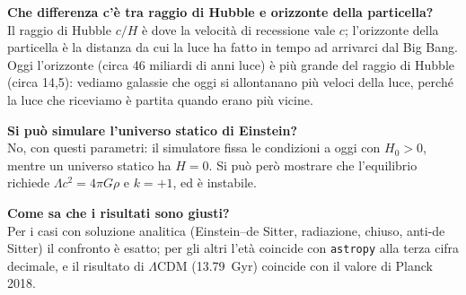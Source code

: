 \documentclass[11pt,a4paper]{article}
\begin{document}
\begin{orale}
\textbf{Che differenza c'è tra raggio di Hubble e orizzonte della particella?}\\
Il raggio di Hubble $c/H$ è dove la velocità di recessione vale $c$; l'orizzonte della particella è la distanza da cui la luce ha fatto in tempo ad arrivarci dal Big Bang. Oggi l'orizzonte (circa 46 miliardi di anni luce) è più grande del raggio di Hubble (circa 14,5): vediamo galassie che oggi si allontanano più veloci della luce, perché la luce che riceviamo è partita quando erano più vicine.
\end{orale}

\begin{orale}
\textbf{Si può simulare l'universo statico di Einstein?}\\
No, con questi parametri: il simulatore fissa le condizioni a oggi con $H_0>0$, mentre un universo statico ha $H=0$. Si può però mostrare che l'equilibrio richiede $\Lambda c^2=4\pi G\rho$ e $k=+1$, ed è instabile.
\end{orale}

\begin{orale}
\textbf{Come sa che i risultati sono giusti?}\\
Per i casi con soluzione analitica (Einstein--de Sitter, radiazione, chiuso, anti-de Sitter) il confronto è esatto; per gli altri l'età coincide con \texttt{astropy} alla terza cifra decimale, e il risultato di $\Lambda$CDM (\SI{13.79}{Gyr}) coincide con il valore di Planck 2018.
\end{orale}
\end{document}
